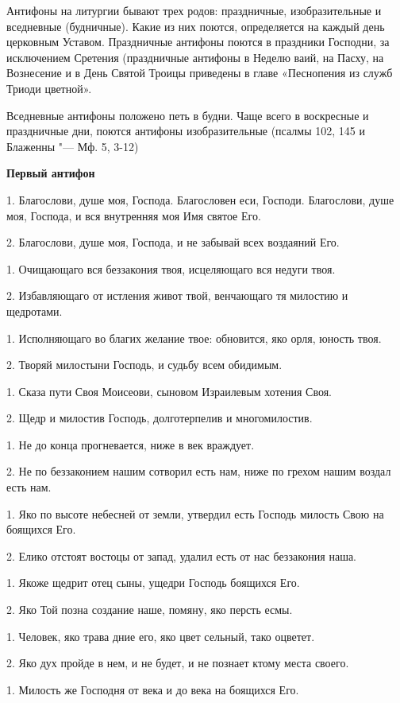 Антифоны на литургии бывают трех родов: праздничные, изобразительные и вседневные (будничные). Какие из них поются, определяется на каждый день церковным Уставом. Праздничные антифоны поются в праздники Господни, за исключением Сретения (праздничные антифоны в Неделю ваий, на Пасху, на Вознесение и в День Святой Троицы приведены в главе «Песнопения из служб Триоди цветной».


Вседневные антифоны положено петь в будни. Чаще всего в воскресные и праздничные дни, поются антифоны изобразительные (псалмы 102, 145 и Блаженны "--- Мф. 5, 3-12)


\medskip\bfseries Первый антифон \normalfont{}\nopagebreak


1. Благослови, душе моя, Господа. Благословен еси, Господи. Благослови, душе моя, Господа, и вся внутренняя моя Имя святое Его. 


2. Благослови, душе моя, Господа, и не забывай всех воздаяний Его. 


1. Очищающаго вся беззакония твоя,  исцеляющаго вся недуги твоя. 


2. Избавляющаго от истления живот твой,  венчающаго тя милостию и щедротами. 


1. Исполняющаго во благих желание твое:  обновится, яко орля, юность твоя. 


2. Творяй милостыни Господь, и судьбу всем обидимым. 


1. Сказа пути Своя Моисеови, сыновом Израилевым хотения Своя. 


2. Щедр и милостив Господь, долготерпелив и многомилостив.


1. Не до конца прогневается, ниже в век враждует. 


2. Не по беззаконием нашим сотворил есть нам, ниже по грехом нашим воздал есть нам. 


1. Яко по высоте небесней от земли,  утвердил есть Господь милость Свою на боящихся Его. 


2. Елико отстоят востоцы от запад,  удалил есть от нас беззакония наша. 


1. Якоже щедрит отец сыны, ущедри Господь боящихся Его. 


2. Яко Той позна создание наше, помяну, яко персть есмы. 


1. Человек, яко трава дние его, яко цвет сельный, тако оцветет. 


2. Яко дух пройде в нем, и не будет, и не познает ктому места своего. 


1. Милость же Господня от века и до века на боящихся Его. 


